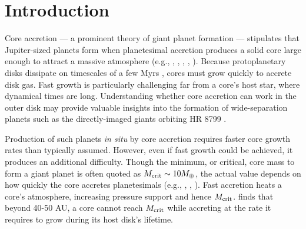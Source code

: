 
\section{Introduction}
\label{intro}

Core accretion --- a prominent theory of giant planet formation --- stipulates that Jupiter-sized planets form when planetesimal accretion produces a solid core large enough to attract a massive atmosphere   (e.g., \citealt{mizuno78}, \citealt{stevenson82}, \citealt{boden86}, \citealt{wuchterl93}, \citealt{dangelo11}). Because protoplanetary disks dissipate on timescales of a few Myrs \citep[e.g.,][]{jay99}, cores must grow quickly to accrete disk gas. Fast  growth is particularly challenging far from a core's host star, where dynamical times are long. %
Understanding whether core accretion can work in the outer disk may provide valuable insights into the formation of wide-separation planets such as the directly-imaged giants orbiting HR 8799 \citep{marois08}.

Production of such planets \textit{in situ} by core accretion requires faster core growth rates than typically assumed.  However, even if fast  growth could be achieved, it produces an additional difficulty.  Though the minimum, or critical, core mass to form a giant planet is often quoted as $M_{\rm crit}\sim 10M_{\oplus}$, the actual value depends on how quickly the core accretes planetesimals  (e.g.,  \citealt{pollack96}, \citealt{ikoma00}, \citealt{rafikov06}).  Fast accretion heats a core's atmosphere, increasing pressure support and hence $M_{\rm crit}$.  \citet{rafikov11} finds that beyond 40-50 AU, a core cannot  reach $M_{\rm crit}$ while accreting at the rate it requires to grow during its host disk's lifetime.

